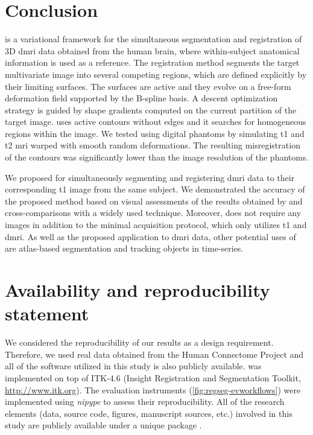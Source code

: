 \section*{Conclusion}
\label{sec:regseg-conclusion}

\Regseg{} is a variational framework for the simultaneous segmentation and
  registration of 3D \gls*{dmri} data obtained from the human brain, where within-subject
  anatomical information is used as a reference.
The registration method segments the target multivariate image into several competing regions, which are
  defined explicitly by their limiting surfaces.
The surfaces are active and they evolve on a free-form deformation field supported by the B-spline basis.
A descent optimization strategy is guided by shape gradients computed on the current partition
  of the target image.
\Regseg{} uses active contours without edges and it searches for
  homogeneous regions within the image.
We tested \regseg{} using digital phantoms by simulating \gls*{t1} and \gls*{t2} \gls*{mri}
  warped with smooth random deformations.
The resulting misregistration of the contours was significantly lower than the image resolution
  of the phantoms.

We proposed \regseg{} for simultaneously segmenting and registering \gls*{dmri} data to
  their corresponding \gls*{t1} image from the same subject.
We demonstrated the accuracy of the proposed method based on visual assessments of the results
  obtained by \regseg{} and cross-comparisons with a widely used technique.
Moreover, \regseg{} does not require any images in addition to the minimal acquisition protocol,
  which only utilizes \gls*{t1} and \gls*{dmri}.
As well as the proposed application to \gls*{dmri} data, other potential uses of \regseg{} are
  atlas-based segmentation and tracking objects in time-series.


\section*{Availability and reproducibility statement}
\label{sec:regseg-availability}
We considered the reproducibility of our results as a design requirement.
Therefore, we used real data obtained from the Human Connectome Project \citep{essen_human_2012}
  and all of the software utilized in this study is also publicly available.
\Regseg{} was implemented on top of ITK-4.6 (Insight Registration and
  Segmentation Toolkit, \url{http://www.itk.org}).
The evaluation instruments (\autoref{fig:regseg-evworkflows}) were implemented using
  \emph{nipype} \citep{gorgolewski_nipype_2011} to assess their reproducibility.
All of the research elements (data, source code, figures, manuscript sources, etc.) involved in this study
  are publicly available under a unique package \citep{esteban_acweregistration_2015}.